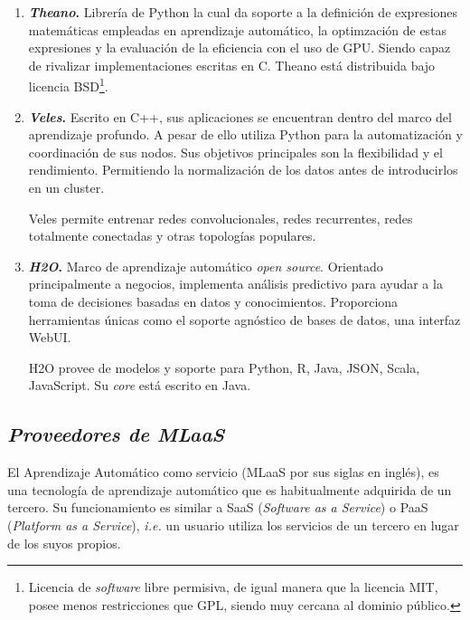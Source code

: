 \begin{enumerate}
\item \textbf{\textit{Theano}.}
Librería de Python la cual da soporte a la definición  de expresiones matemáticas empleadas en aprendizaje automático, la optimzación de estas expresiones y la evaluación de la eficiencia con el uso de GPU. Siendo capaz de rivalizar implementaciones escritas en C. Theano está distribuida bajo licencia BSD\footnote{Licencia de \textit{software} libre permisiva, de igual manera que la licencia MIT, posee menos restricciones que GPL, siendo muy cercana al dominio público.}.

\item \textbf{\textit{Veles}.}
Escrito en C++, sus aplicaciones se encuentran dentro del marco del aprendizaje profundo. A pesar de ello utiliza Python para la automatización y coordinación de sus nodos. Sus objetivos principales son la flexibilidad y el rendimiento. Permitiendo la normalización de los datos antes de introducirlos en un cluster.

Veles permite entrenar redes convolucionales, redes recurrentes, redes totalmente conectadas y otras topologías populares.

\item \textbf{\textit{H2O}.}
Marco de aprendizaje automático \textit{open source}. Orientado principalmente a negocios, implementa análisis predictivo para ayudar a la toma de decisiones basadas en datos y conocimientos. Proporciona herramientas únicas como el soporte agnóstico de bases de datos, una interfaz WebUI. 

H2O provee de modelos y soporte para Python, R, Java, JSON, Scala, JavaScript. Su \textit{core} está escrito en Java.

\end{enumerate}

\subsection{\textit{Proveedores de MLaaS}}\label{related:MLaaS}
El Aprendizaje Automático como servicio (MLaaS por sus siglas en inglés), es una tecnología de aprendizaje automático que es habitualmente adquirida de un tercero. Su funcionamiento es similar a SaaS (\textit{Software as a Service}) o PaaS (\textit{Platform as a Service}), \textit{i.e.} un usuario utiliza los servicios de un tercero en lugar de los suyos propios.

